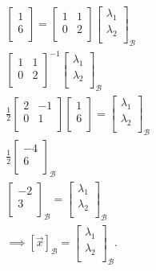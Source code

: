 \documentclass{report}
\begin{document}
   \begin{align*}
    &  \begin{bmatrix}
     1\\
     6\\
     \end{bmatrix}  =   \begin{bmatrix}
     1 & 1\\
     0 & 2\\
     \end{bmatrix} \begin{bmatrix}
     \lambda_1\\
     \lambda_2\\
     \end{bmatrix}
     _{ \mathcal{B}}\\
     &  \begin{bmatrix}
     1 & 1\\
     0 & 2\\
     \end{bmatrix} ^{-1} \begin{bmatrix}
     \lambda_1\\
     \lambda_2\\
     \end{bmatrix}
     _{ \mathcal{B}} \\
     &  \frac{1}{2} \begin{bmatrix}
     2 & -1\\
     0 & 1\\
     \end{bmatrix} \begin{bmatrix}
     1\\
     6\\
     \end{bmatrix}
     = \begin{bmatrix}
     \lambda_1\\
     \lambda_2\\
     \end{bmatrix}
     _{ \mathcal{B}}\\
     & \frac{1}{2} \begin{bmatrix}
     -4\\
     6\\
     \end{bmatrix}
     _{ \mathcal{B}}\\
     & \begin{bmatrix}
     -2\\
     3\\
     \end{bmatrix}
     _{ \mathcal{B}} = \begin{bmatrix}
     \lambda_1\\
     \lambda_2\\
     \end{bmatrix}
     _{ \mathcal{B}}\\
     & \implies \left[ \vec{ x}  \right]_{ \mathcal{B}} = \begin{bmatrix}
     \lambda_1\\
     \lambda_2\\
     \end{bmatrix}
     _{ \mathcal{B}} 
   .\end{align*}
    
\end{document}
